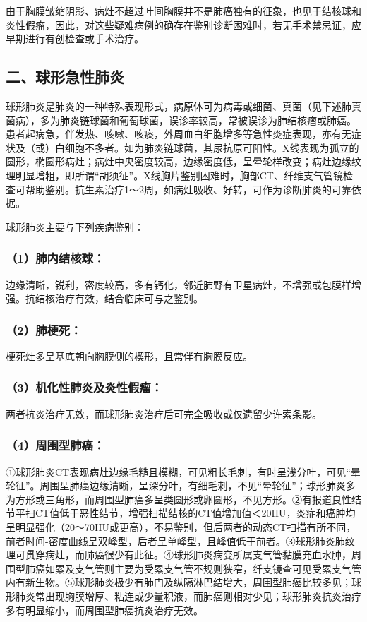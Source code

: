 由于胸膜皱缩阴影、病灶不超过叶间胸膜并不是肺癌独有的征象，也见于结核球和炎性假瘤，因此，对这些疑难病例的确存在鉴别诊断困难时，若无手术禁忌证，应早期进行有创检查或手术治疗。

\subsection{二、球形急性肺炎}

球形肺炎是肺炎的一种特殊表现形式，病原体可为病毒或细菌、真菌（见下述肺真菌病），多为肺炎链球菌和葡萄球菌，误诊率较高，常被误诊为肺结核瘤或肺癌。患者起病急，伴发热、咳嗽、咳痰，外周血白细胞增多等急性炎症表现，亦有无症状及（或）白细胞不多者。如为肺炎链球菌，其尿抗原可阳性。X线表现为孤立的圆形，椭圆形病灶；病灶中央密度较高，边缘密度低，呈晕轮样改变；病灶边缘纹理明显增粗，即所谓“胡须征”。X线胸片鉴别困难时，胸部CT、纤维支气管镜检查可帮助鉴别。抗生素治疗1～2周，如病灶吸收、好转，可作为诊断肺炎的可靠依据。

球形肺炎主要与下列疾病鉴别：

\subsubsection{（1）肺内结核球：}

边缘清晰，锐利，密度较高，多有钙化，邻近肺野有卫星病灶，不增强或包膜样增强。抗结核治疗有效，结合临床可与之鉴别。

\subsubsection{（2）肺梗死：}

梗死灶多呈基底朝向胸膜侧的楔形，且常伴有胸膜反应。

\subsubsection{（3）机化性肺炎及炎性假瘤：}

两者抗炎治疗无效，而球形肺炎治疗后可完全吸收或仅遗留少许索条影。

\subsubsection{（4）周围型肺癌：}

①球形肺炎CT表现病灶边缘毛糙且模糊，可见粗长毛刺，有时呈浅分叶，可见“晕轮征”。周围型肺癌边缘清晰，呈深分叶，有细毛刺，不见“晕轮征”；球形肺炎多为方形或三角形，而周围型肺癌多呈类圆形或卵圆形，不见方形。②有报道良性结节平扫CT值低于恶性结节，增强扫描结核的CT值增加值＜20HU，炎症和癌肿均呈明显强化（20～70HU或更高），不易鉴别，但后两者的动态CT扫描有所不同，前者时间-密度曲线呈双峰型，后者呈单峰型，且峰值低于前者。③球形肺炎肺纹理可贯穿病灶，而肺癌很少有此征。④球形肺炎病变所属支气管黏膜充血水肿，周围型肺癌如累及支气管则主要为受累支气管不规则狭窄，纤支镜查可见受累支气管内有新生物。⑤球形肺炎极少有肺门及纵隔淋巴结增大，周围型肺癌比较多见；球形肺炎常出现胸膜增厚、粘连或少量积液，而肺癌则相对少见；球形肺炎抗炎治疗多有明显缩小，而周围型肺癌抗炎治疗无效。

